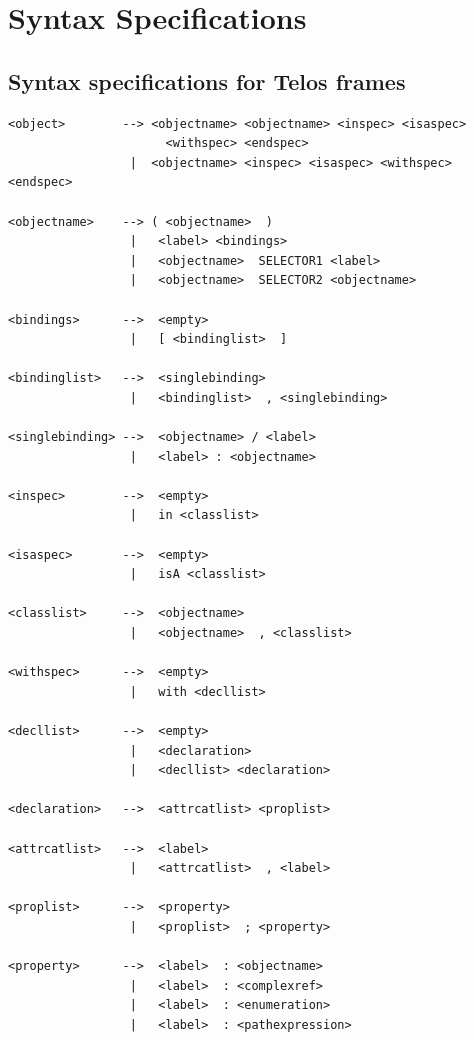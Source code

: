 %

\chapter{Syntax Specifications}
\label{cha:syntax}


\section{Syntax specifications for Telos frames}
\label{sec:telos objects}

{\small
\begin{verbatim}
<object>        --> <objectname> <objectname> <inspec> <isaspec> 
                      <withspec> <endspec>
                 |  <objectname> <inspec> <isaspec> <withspec> <endspec>

<objectname>    --> ( <objectname>  )
                 |   <label> <bindings>
                 |   <objectname>  SELECTOR1 <label>
                 |   <objectname>  SELECTOR2 <objectname>

<bindings>      -->  <empty>
                 |   [ <bindinglist>  ]

<bindinglist>   -->  <singlebinding>
                 |   <bindinglist>  , <singlebinding>

<singlebinding> -->  <objectname> / <label>
                 |   <label> : <objectname>

<inspec>        -->  <empty>
                 |   in <classlist>

<isaspec>       -->  <empty>
                 |   isA <classlist>

<classlist>     -->  <objectname>
                 |   <objectname>  , <classlist>

<withspec>      -->  <empty>
                 |   with <decllist>

<decllist>      -->  <empty>
                 |   <declaration>
                 |   <decllist> <declaration>

<declaration>   -->  <attrcatlist> <proplist>

<attrcatlist>   -->  <label>
                 |   <attrcatlist>  , <label>

<proplist>      -->  <property>
                 |   <proplist>  ; <property>

<property>      -->  <label>  : <objectname>
                 |   <label>  : <complexref>
                 |   <label>  : <enumeration>
                 |   <label>  : <pathexpression>


\end{verbatim}}
